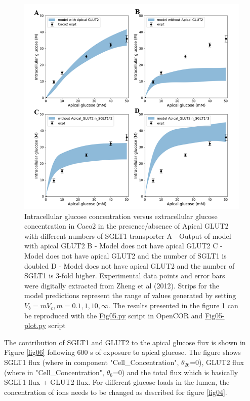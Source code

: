 \documentclass[fleqn,10pt]{physiome}
\begin{document}
\begin{figure}[ht]
\centering
\includegraphics[width=0.8\linewidth]{fig05.png}
\caption{Intracellular glucose concentration versus extracellular glucose concentration in Caco2 in the presence/absence of Apical GLUT2 with different numbers of SGLT1 transporter A - Output of model with apical GLUT2 B - Model does not have apical GLUT2 C - Model does not have apical GLUT2 and the number of SGLT1 is doubled D -  Model does not have apical GLUT2 and the number of SGLT1 is 3-fold higher. Experimental data points and error bars were digitally extracted from Zheng et al (2012). Strips for the model predictions represent the range of values generated by setting $V_b = m V_c, m = 0.1, 1, 10, \infty$. The results presented in the figure \ref{fig05} can be reproduced with the \href{https://models.physiomeproject.org/workspace/572/file/c052b0c460280139dad150937fbee4fa6a026505/SEDML_files/Fig05.py}{Fig05.py} script in OpenCOR and \href{https://models.physiomeproject.org/workspace/572/file/c052b0c460280139dad150937fbee4fa6a026505/SEDML_files/Fig05_plot.py}{Fig05-plot.py} script}
\label{fig05}
\end{figure}

The contribution of SGLT1 and GLUT2 to the apical glucose flux is shown in Figure \ref{fig06} following 600 s of exposure to apical glucose. The figure shows SGLT1 flux (where in component "Cell\_Concentration", {$\theta_{26}$}=0), GLUT2 flux (where in "Cell\_Concentration", {$\theta_{6}$}=0) and the total flux which is basically SGLT1 flux + GLUT2 flux. For different glucose loads in the lumen, the concentration of ions needs to be changed as described for figure \ref{fig04}.\newpage
\end{document}
